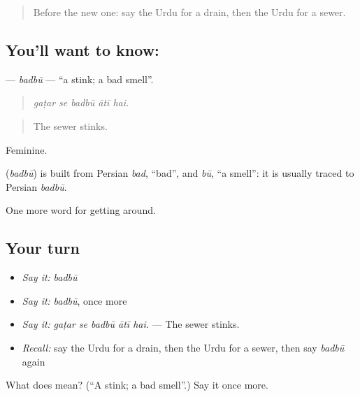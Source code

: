 \begin{quote}
Before the new one: say the Urdu for a drain, then the Urdu for a sewer.
\end{quote}

\subsection*{You'll want to know: }
\textbf{} — \emph{badbū} — \textquotedblleft{}a stink; a bad smell\textquotedblright{}.

\begin{quote}
    
\end{quote}

\begin{quote}
\emph{gaṭar se badbū ātī hai.}
\end{quote}

\begin{quote}
The sewer stinks.
\end{quote}

Feminine.

\begin{cousinweb}
\textbf{} (\emph{badbū}) is built from Persian \emph{bad}, \textquotedblleft{}bad\textquotedblright{}, and \emph{bū}, \textquotedblleft{}a smell\textquotedblright{}: it is usually traced to Persian \emph{badbū}.
\end{cousinweb}

\begin{grammarlens}[title={What you've built}]
One more word for getting around.
\end{grammarlens}

\subsection*{Your turn}
\begin{itemize}
\raggedright
  \item \emph{Say it:} \emph{badbū}
  \item \emph{Say it:} \emph{badbū}, once more
  \item \emph{Say it:} \emph{gaṭar se badbū ātī hai.} — The sewer stinks.
  \item \emph{Recall:} say the Urdu for a drain, then the Urdu for a sewer, then say \emph{badbū} again
\end{itemize}

\begin{tcolorbox}[breakable,colback=teal!4,colframe=teal!35!black,title={Before you move on}]
What does  mean? (\textquotedblleft{}A stink; a bad smell\textquotedblright{}.) Say it once more.
\end{tcolorbox}
